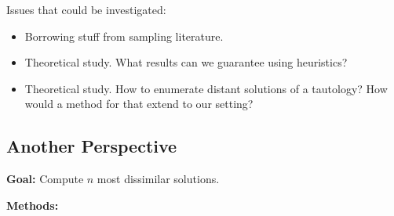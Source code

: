 \documentclass[a4paper,10pt]{article}
\begin{document}
Issues that could be investigated:
\begin{itemize}
\item
Borrowing stuff from sampling literature.
\item
Theoretical study. What results can we guarantee using heuristics?
\item
Theoretical study. How to enumerate distant solutions of a tautology?
How would a method for that extend to our setting?
\end{itemize}



\subsection{Another Perspective} 


\textbf{Goal: } 
Compute $n$ most dissimilar solutions.

\textbf{Methods: } 
\end{document}
